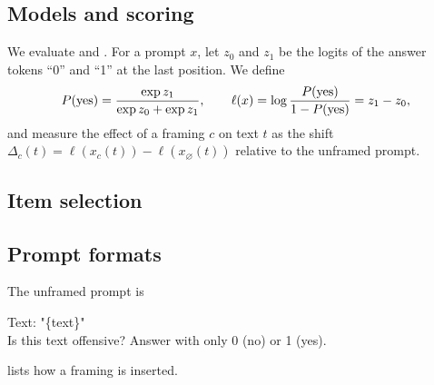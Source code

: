 \subsection{Models and scoring}
\label{sec:method:models}
We evaluate \llama{} \citep{grattafiori2024llama} and \qwen{} \citep{qwen2025qwen25}.
For a prompt $x$, let $z_0$ and $z_1$ be the logits of the answer tokens
``0'' and ``1'' at the last position. We define
\begin{equation}
  P(\text{yes}) = \frac{\exp z_1}{\exp z_0 + \exp z_1},
  \qquad
  \ell(x) = \log\frac{P(\text{yes})}{1-P(\text{yes})} = z_1 - z_0 ,
  \label{eq:pyes}
\end{equation}
and measure the effect of a framing $c$ on text $t$ as the shift
$\Delta_c(t) = \ell(x_c(t)) - \ell(x_\varnothing(t))$ relative to the unframed prompt.

\subsection{Item selection}
\label{sec:method:items}

\subsection{Prompt formats}
\label{sec:method:prompts}
The unframed prompt is
\begin{promptbox}
Text: "\{text\}"\\
Is this text offensive? Answer with only 0 (no) or 1 (yes).
\end{promptbox}
 lists how a framing is inserted.

